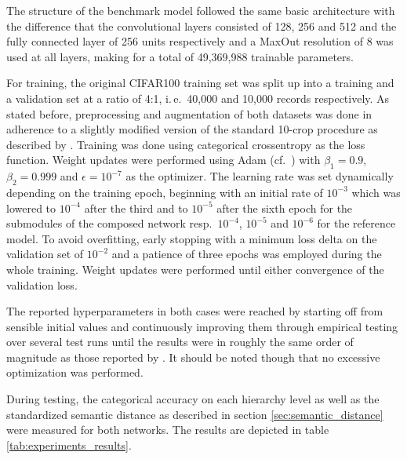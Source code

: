 \documentclass[conference]{IEEEtran}
\begin{document}
The structure of the benchmark model followed the same basic architecture with the difference that the convolutional layers consisted of 128, 256 and 512 and the fully connected layer of 256 units respectively and a MaxOut resolution of 8 was used at all layers, making for a total of 49,369,988 trainable parameters.

For training, the original CIFAR100 training set was split up into a training and a validation set at a ratio of 4:1, i.\,e.\ 40,000 and 10,000 records respectively. As stated before, preprocessing and augmentation of both datasets was done in adherence to a slightly modified version of the standard 10-crop procedure as described by \cite{Krizhevsky2012-jr}. Training was done using categorical crossentropy as the loss function. Weight updates were performed using Adam (cf.\ \cite{Kingma2014-db}) with $\beta_1 = 0.9$, $\beta_2 = 0.999$ and $\epsilon = 10^{-7}$ as the optimizer. The learning rate was set dynamically depending on the training epoch, beginning with an initial rate of $10^{-3}$ which was lowered to $10^{-4}$ after the third and to $10^{-5}$ after the sixth epoch for the submodules of the composed network resp.~$10^{-4}$, $10^{-5}$ and $10^{-6}$ for the reference model. To avoid overfitting, early stopping with a minimum loss delta on the validation set of $10^{-2}$ and a patience of three epochs was employed during the whole training. Weight updates were performed until either convergence of the validation loss.

The reported hyperparameters in both cases were reached by starting off from sensible initial values and continuously improving them through empirical testing over several test runs until the results were in roughly the same order of magnitude as those reported by \cite{Goodfellow2013-za}. It should be noted though that no excessive optimization was performed.

During testing, the categorical accuracy on each hierarchy level as well as the standardized semantic distance as described in section \ref{sec:semantic_distance} were measured for both networks. The results are depicted in table \ref{tab:experiments_results}.
\end{document}
